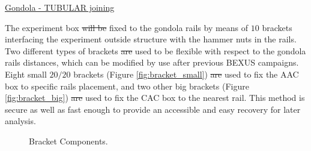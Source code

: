 \documentclass[a4paper,12pt,oneside]{article}
\providecommand{\DIFaddtex}[1]{{\protect\color{blue}\uwave{#1}}} %
\providecommand{\DIFdeltex}[1]{{\protect\color{red}\sout{#1}}}                      %
\providecommand{\DIFaddbegin}{} %
\providecommand{\DIFaddend}{} %
\providecommand{\DIFdelbegin}{} %
\providecommand{\DIFdelend}{} %
\providecommand{\DIFadd}[1]{\texorpdfstring{\DIFaddtex{#1}}{#1}} %
\providecommand{\DIFdel}[1]{\texorpdfstring{\DIFdeltex{#1}}{}} %
\newcommand{\DIFscaledelfig}{0.5}
\newlength{\DIFdelgraphicswidth} %
\newlength{\DIFdelgraphicsheight} %
\newcommand{\DIFaddincludegraphics}[2][]{{\color{blue}\fbox{\DIFOincludegraphics[#1]{#2}}}} %
\newcommand{\DIFdelincludegraphics}[2][]{%
\sbox{\DIFdelgraphicsbox}{\DIFOincludegraphics[#1]{#2}}%
\settoboxwidth{\DIFdelgraphicswidth}{\DIFdelgraphicsbox} %
\settoboxtotalheight{\DIFdelgraphicsheight}{\DIFdelgraphicsbox} %
\scalebox{\DIFscaledelfig}{%
\parbox[b]{\DIFdelgraphicswidth}{\usebox{\DIFdelgraphicsbox}\\[-\baselineskip] \rule{\DIFdelgraphicswidth}{0em}}\llap{\resizebox{\DIFdelgraphicswidth}{\DIFdelgraphicsheight}{%
\setlength{\unitlength}{\DIFdelgraphicswidth}%
\begin{picture}(1,1)%
\thicklines\linethickness{2pt} %
{\color[rgb]{1,0,0}\put(0,0){\framebox(1,1){}}}%
{\color[rgb]{1,0,0}\put(0,0){\line( 1,1){1}}}%
{\color[rgb]{1,0,0}\put(0,1){\line(1,-1){1}}}%
\end{picture}%
}\hspace*{3pt}}} %
} %
\DeclareRobustCommand{\DIFaddbegin}{\DIFOaddbegin \let\includegraphics\DIFaddincludegraphics} %
\DeclareRobustCommand{\DIFaddend}{\DIFOaddend \let\includegraphics\DIFOincludegraphics} %
\DeclareRobustCommand{\DIFdelbegin}{\DIFOdelbegin \let\includegraphics\DIFdelincludegraphics} %
\DeclareRobustCommand{\DIFdelend}{\DIFOaddend \let\includegraphics\DIFOincludegraphics} %
\begin{document}
\underline{Gondola - TUBULAR joining}

\smallskip
The experiment box \DIFdelbegin \DIFdel{will be }\DIFdelend \DIFaddbegin \DIFadd{was }\DIFaddend fixed to the gondola rails by means of $10$ brackets interfacing the experiment outside structure with the hammer nuts in the rails. Two different types of brackets \DIFdelbegin \DIFdel{are }\DIFdelend \DIFaddbegin \DIFadd{were }\DIFaddend used to be flexible with respect to the gondola rails distances, which can be modified by use after previous BEXUS campaigns. Eight small $20/20$ brackets (Figure \ref{fig:bracket_small}) \DIFdelbegin \DIFdel{are }\DIFdelend \DIFaddbegin \DIFadd{were }\DIFaddend used to fix the AAC box to specific rails placement, and two other big brackets (Figure \ref{fig:bracket_big}) \DIFdelbegin \DIFdel{are }\DIFdelend \DIFaddbegin \DIFadd{were }\DIFaddend used to fix the CAC box to the nearest rail. This method is secure as well as fast enough to provide an accessible and easy recovery for later analysis.

\begin{figure}[H]
    \noindent{}
    \caption{Bracket Components.}
    \label{fig:bracket}
\end{figure}
\end{document}
